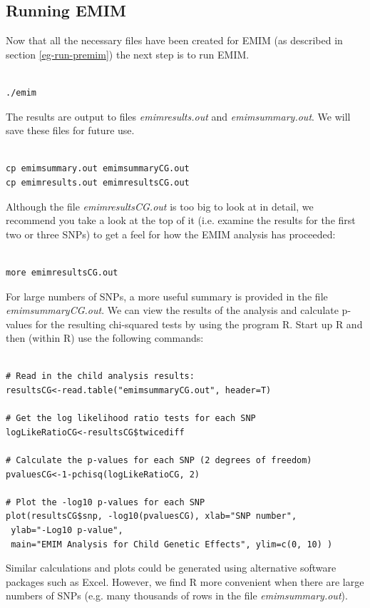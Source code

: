 \documentclass[a4paper,12pt]{article}
\begin{document}
\subsection{Running EMIM}
\label{eg-run-emim}

Now that all the necessary files have been created for EMIM (as described in  section \ref{eg-run-premim}) the next step is to run EMIM. 
\vspace{0.35cm} \begin{lstlisting}

./emim

\end{lstlisting} \vspace{0.35cm}
The results are output to files {\it emimresults.out} and {\it emimsummary.out}. We will save these files for future use. 
\vspace{0.35cm} \begin{lstlisting}

cp emimsummary.out emimsummaryCG.out
cp emimresults.out emimresultsCG.out

\end{lstlisting} \vspace{0.35cm}
Although the file {\it emimresultsCG.out} is too big to look at in detail, we recommend you take a look at the top of it (i.e. examine the results for the first two or three SNPs) to get a feel for how the EMIM analysis has proceeded: 
\vspace{0.35cm} \begin{lstlisting}

more emimresultsCG.out

\end{lstlisting} \vspace{0.35cm}
For large numbers of SNPs, a more useful summary is provided in the file {\it emimsummaryCG.out}. We can view the results of the analysis and calculate p-values for the resulting chi-squared tests by using the program R. Start up R and then (within R) use the following commands: 
\vspace{0.35cm} \begin{lstlisting}

# Read in the child analysis results:
resultsCG<-read.table("emimsummaryCG.out", header=T)

# Get the log likelihood ratio tests for each SNP
logLikeRatioCG<-resultsCG$twicediff

# Calculate the p-values for each SNP (2 degrees of freedom)
pvaluesCG<-1-pchisq(logLikeRatioCG, 2)

# Plot the -log10 p-values for each SNP
plot(resultsCG$snp, -log10(pvaluesCG), xlab="SNP number",
 ylab="-Log10 p-value",
 main="EMIM Analysis for Child Genetic Effects", ylim=c(0, 10) )

\end{lstlisting} \vspace{0.35cm}
Similar calculations and plots could be generated using alternative software packages such as Excel. However, we find R more convenient when there are large numbers of SNPs (e.g. many thousands of rows in the file {\it emimsummary.out}). 
\end{document}
